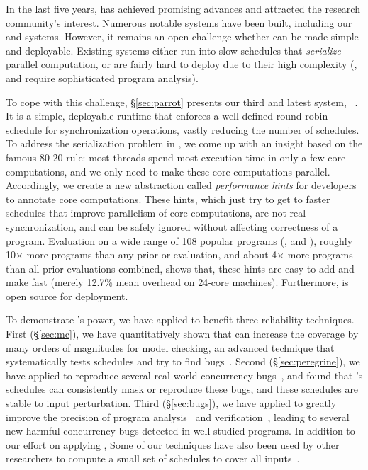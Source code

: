  In the last five years, \smt has achieved promising advances and attracted the research community's interest. Numerous notable \smt systems have been built, including our \tern and 
\peregrine systems. However, it remains an open challenge whether
\smt can be made simple and deployable. Existing \smt systems either run into slow schedules that
\emph{serialize} parallel computation, or are fairly hard to deploy
due to their high complexity (\eg, \tern and \peregrine require sophisticated program analysis).

To cope with this challenge, \S\ref{sec:parrot} presents our third and latest \smt system, 
\parrot~\cite{parrot:sosp13}. It is a simple, deployable runtime that enforces a well-defined
round-robin schedule for synchronization operations, vastly reducing the number of
schedules. To address the serialization problem in \smt,
we come up with an insight based on the famous 80-20 rule: most threads spend most 
execution time in only a few core computations, and we only need to make 
these core computations parallel. Accordingly, we create a 
new abstraction called \emph{performance hints} for developers to 
annotate core computations. These hints, which just try to get to faster schedules that improve 
parallelism of core computations, are not real 
synchronization, and can be safely ignored without affecting correctness of a 
program. Evaluation on a wide range of 108 popular programs (\eg, \bdb and \mplayer),
roughly 10$\times$ more programs than any prior \smt or 
\dmt evaluation, and about 4$\times$ more programs than all prior evaluations combined, 
shows that, these hints are easy to add and make \parrot fast
(merely 12.7\% mean overhead on 24-core machines). Furthermore, \parrot is open source for deployment.

To demonstrate \smt's power, we have applied \smt to benefit three reliability techniques. First (\S\ref{sec:mc}), we have quantitatively shown that \smt can increase the coverage by many orders of magnitudes for model checking, an advanced technique that systematically tests schedules and try to find bugs~\cite{parrot:sosp13, dbug:spin11, modist:nsdi09}. Second (\S\ref{sec:peregrine}), we have applied \smt to reproduce several real-world concurrency bugs~\cite{cui:tern:osdi10}, and found that \smt's schedules can consistently mask or reproduce these bugs, and these schedules are stable to input perturbation. Third (\S\ref{sec:bugs}), we have applied \smt to greatly improve the precision of program analysis~\cite{wu:pldi12} and verification~\cite{wu:pldi12}, leading to several new harmful concurrency bugs detected in well-studied programs. In addition to our effort on applying \smt, Some of our \smt techniques have also been used by other researchers to compute a small set of schedules to cover all inputs~\cite{bergan:oopsla13}.

